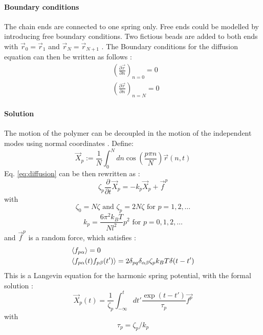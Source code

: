 \documentclass[
    paper=A4,pagesize=automedia,fontsize=12pt,
    BCOR=15mm,DIV=22,
    twoside,headinclude,footinclude=false,
    fleqn,             %
    bibliography=totocnumbered,          %
    listof=totoc,                %
    listof=flat,                 %
    cleardoublepage=empty      %
    numbers=endperiod
]{scrartcl}
\begin{document}
\paragraph{Boundary conditions}
The chain ends are connected to one spring only. Free ends could be modelled by 
introducing free boundary conditions. Two 
fictious beads are added to both ends with 
$\vec{r}_0=\vec{r}_1$ and $\vec{r}_N=\vec{r}_{N+1}$ \cite{Doi_Edwards_PD:1994}. 
The Boundary 
conditions for the diffusion equation can then 
be written as follows \cite{Doi_Edwards_PD:1994}:
\begin{equation}
    \label{eq:rouse_boundary}
    \begin{aligned}
        & \left(\frac{\partial \vec{r}}{\partial n}\right)_{n=0} = 0\\
        & \left(\frac{\partial \vec{r}}{\partial n}\right)_{n=N} = 0
    \end{aligned}
\end{equation}

\paragraph{Solution}
The motion of the polymer can be decoupled in the motion of the independent modes using normal
coordinates \cite{Doi_Edwards_PD:1994}. Define:
\begin{equation}
    \label{eq:rouse_mode}
    \vec{X}_p := \frac{1}{N} \int_0^N dn \cos(\frac{p \pi n}{N})\vec{r}(n, t)
\end{equation}
Eq. \ref{eq:diffusion} can be then rewritten as \cite{Doi_Edwards_PD:1994}:
\begin{equation}
    \zeta_p \frac{\partial}{\partial t} \vec{X}_p = -k_p \vec{X}_p + \vec{f}^p
\end{equation}
with 
\begin{equation}
    \zeta_0 = N \zeta
    \text{ and }
    \zeta_p = 2 N \zeta
    \text{ for } p = 1,2,\ldots
\end{equation}
\begin{equation}
    k_p = \frac{6 \pi^2 k_B T}{Nl^2} p^2
    \text{ for } p = 0,1,2,\ldots
\end{equation}
and $\vec{f}^p$ is a random force, which satisfies \cite{Doi_Edwards_PD:1994}:
\begin{equation}
    \begin{aligned}
        & \langle f_{p\alpha}\rangle = 0\\
        & \langle f_{p\alpha}(t) f_{p\beta}(t')\rangle = 2 \delta_{pq} \delta_{\alpha\beta} \zeta_p k_B T \delta(t-t')
    \end{aligned}
\end{equation}
This is a Langevin equation for the harmonic spring potential, 
with the formal solution \cite{Doi_Edwards_PD:1994}:
\begin{equation}
    \vec{X}_p(t) = \frac{1}{\zeta_p} \int_{-\infty}^{t} dt' \frac{\exp(t-t')}{\tau_p} \vec{f^p}
\end{equation}
with
\begin{equation} \label{eq:tau_p_rouse_fullflex}
    \tau_p = \zeta_p / k_p
\end{equation}
\end{document}
